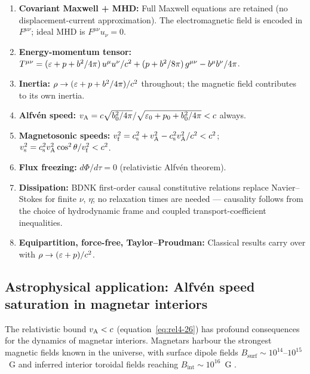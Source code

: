 \begin{enumerate}
\item \textbf{Covariant Maxwell + MHD:} Full Maxwell equations are retained
      (no displacement-current approximation).  The electromagnetic field
      is encoded in $F^{\mu\nu}$; ideal MHD is $F^{\mu\nu}u_{\nu}=0$.
\item \textbf{Energy-momentum tensor:}
      $T^{\mu\nu}=(\varepsilon+p+b^2/4\pi)\,u^{\mu}u^{\nu}/c^{2}
      +(p+b^2/8\pi)\,g^{\mu\nu}-b^{\mu}b^{\nu}/4\pi$.
\item \textbf{Inertia:} $\rho \to (\varepsilon+p+b^2/4\pi)/c^{2}$
      throughout; the magnetic field contributes to its own inertia.
\item \textbf{Alfv\'en speed:}
      $v_{\mathrm{A}} = c\sqrt{b^2_{0}/4\pi}/\sqrt{\varepsilon_{0}+p_{0}+b^2_{0}/4\pi}
      < c$ always.
\item \textbf{Magnetosonic speeds:}
      $v_{\mathrm{f}}^{2}=c_{\mathrm{s}}^{2}+v_{\mathrm{A}}^{2}-c_{\mathrm{s}}^{2}v_{\mathrm{A}}^{2}/c^{2}<c^{2}$;
      $v_{\mathrm{s}}^{2}=c_{\mathrm{s}}^{2}v_{\mathrm{A}}^{2}\cos^{2}\theta/v_{\mathrm{f}}^{2}<c^{2}$.
\item \textbf{Flux freezing:}
      $d\Phi/d\tau=0$ (relativistic Alfv\'en theorem).
\item \textbf{Dissipation:} BDNK first-order causal constitutive relations
      replace Navier--Stokes for finite $\nu$, $\eta$; no relaxation
      times are needed --- causality follows from the choice of
      hydrodynamic frame and coupled transport-coefficient inequalities.
\item \textbf{Equipartition, force-free, Taylor--Proudman:} Classical
      results carry over with $\rho\to(\varepsilon+p)/c^{2}$.
\end{enumerate}

\subsection*{Astrophysical application: Alfv\'en speed saturation
  in magnetar interiors}

The relativistic bound $v_{\mathrm{A}} < c$ (equation~\eqref{eq:rel4-26}) has
profound consequences for the dynamics of magnetar interiors.  Magnetars
harbour the strongest magnetic fields known in the universe, with
surface dipole fields $B_{\mathrm{surf}} \sim 10^{14}$--$10^{15}$~G
and inferred interior toroidal fields reaching
$B_{\mathrm{int}} \sim 10^{16}$~G
\citep{DuncanThompson1992,ThompsonDuncan1995,Kaspi2017}.

